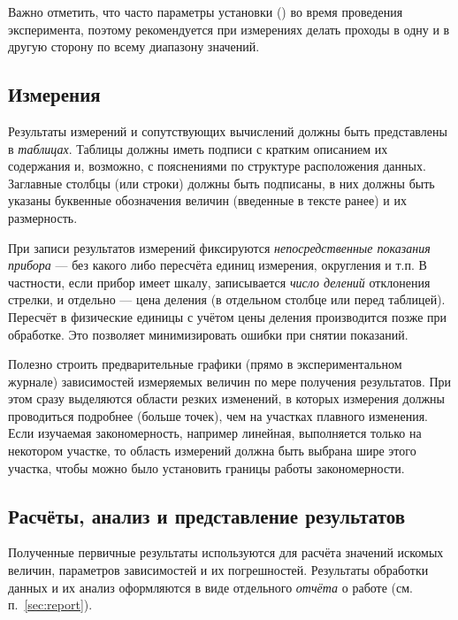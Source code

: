 Важно отметить, что часто параметры установки  ()
во время проведения эксперимента, поэтому рекомендуется при измерениях
делать проходы в одну и в другую сторону по всему диапазону значений.

\subsection{Измерения}

Результаты измерений и сопутствующих вычислений должны быть представлены
в \emph{таблицах}.
Таблицы должны иметь подписи с кратким описанием
их содержания и, возможно, с пояснениями по структуре расположения
данных. Заглавные столбцы (или строки) должны быть подписаны, в них
должны быть указаны буквенные обозначения величин (введенные в тексте
ранее) и их размерность.

При записи результатов измерений фиксируются \emph{непосредственные
показания прибора} --- без какого либо пересчёта единиц измерения,
округления и т.п. В частности, если прибор имеет шкалу, записывается
\emph{число делений} отклонения стрелки, и отдельно --- цена деления
(в отдельном столбце или перед таблицей).
Пересчёт в физические единицы с учётом цены деления производится позже
при обработке. Это позволяет минимизировать ошибки при снятии показаний.

Полезно строить предварительные графики (прямо в экспериментальном журнале)
зависимостей измеряемых величин по мере получения результатов.
При этом сразу выделяются области резких изменений,
в которых измерения должны проводиться подробнее (больше точек),
чем на участках плавного изменения. Если изучаемая закономерность,
например линейная, выполняется только на некотором участке,
то область измерений должна быть выбрана шире этого участка, чтобы можно было
установить границы работы закономерности.


\subsection{Расчёты, анализ и представление результатов}

Полученные первичные результаты используются для расчёта значений искомых 
величин, параметров зависимостей и их погрешностей. Результаты
обработки данных и их анализ оформляются в виде отдельного \emph{отчёта} о работе
(см. п.~\ref{sec:report}).

